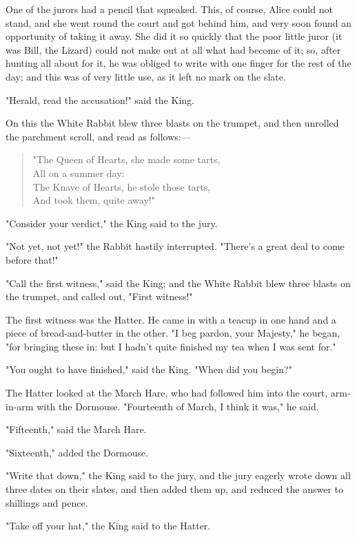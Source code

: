 One of the jurors had a pencil that squeaked. This, of course, Alice could not stand, and she went round the court and got behind him, and very soon found an opportunity of taking it away. She did it so quickly that the poor little juror (it was Bill, the Lizard) could not make out at all what had become of it; so, after hunting all about for it, he was obliged to write with one finger for the rest of the day; and this was of very little use, as it left no mark on the slate.

"Herald, read the accusation!" said the King.

On this the White Rabbit blew three blasts on the trumpet, and then unrolled the parchment scroll, and read as follows:—

\begin{quote}
"The Queen of Hearts, she made some tarts,\\
⁠All on a summer day:\\
The Knave of Hearts, he stole those tarts,\\
⁠And took them, quite away!"
\end{quote}

"Consider your verdict," the King said to the jury.

​"Not yet, not yet!" the Rabbit hastily interrupted. "There's a great deal to come before that!"

"Call the first witness," said the King; and the White Rabbit blew three blasts on the trumpet, and called out, "First witness!"

The first witness was the Hatter. He came in with a teacup in one hand and a piece of bread-and-butter in the other. "I beg pardon, your Majesty," he began, "for bringing these in: but I hadn't quite finished my tea when I was sent for."

"You ought to have finished," said the King. "When did you begin?"

The Hatter looked at the March Hare, who had followed him into the court, arm-in-arm with the Dormouse. "Fourteenth of March, I think it was," he said.

"Fifteenth," said the March Hare.

"Sixteenth," added the Dormouse.

"Write that down," the King said to the jury, and the jury eagerly wrote down all three ​dates on their slates, and then added them up, and reduced the answer to shillings and pence.

"Take off your hat," the King said to the Hatter.

